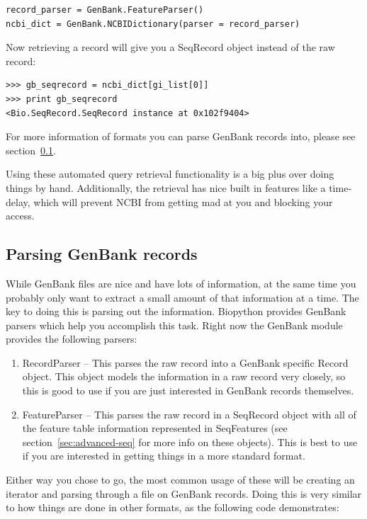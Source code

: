 \documentclass{report}
\begin{document}
\begin{verbatim}
record_parser = GenBank.FeatureParser()
ncbi_dict = GenBank.NCBIDictionary(parser = record_parser)
\end{verbatim}

Now retrieving a record will give you a SeqRecord object instead of the raw record:

\begin{verbatim}
>>> gb_seqrecord = ncbi_dict[gi_list[0]]
>>> print gb_seqrecord
<Bio.SeqRecord.SeqRecord instance at 0x102f9404>
\end{verbatim}

For more information of formats you can parse GenBank records into, please see section~\ref{sec:gb-parsing}.


Using these automated query retrieval functionality is a big plus over doing things by hand. Additionally, the retrieval has nice built in features like a time-delay, which will prevent NCBI from getting mad at you and blocking your access.

\subsection{Parsing GenBank records}
\label{sec:gb-parsing}

While GenBank files are nice and have lots of information, at the same time you probably only want to extract a small amount of that information at a time. The key to doing this is parsing out the information. Biopython provides GenBank parsers which help you accomplish this task. Right now the GenBank module provides the following parsers:

\begin{enumerate}
  \item RecordParser -- This parses the raw record into a GenBank specific Record object. This object models the information in a raw record very closely, so this is good to use if you are just interested in GenBank records themselves.

  \item FeatureParser -- This parses the raw record in a SeqRecord object with all of the feature table information represented in SeqFeatures (see section~\ref{sec:advanced-seq} for more info on these objects). This is best to use if you are interested in getting things in a more standard format.
\end{enumerate}

Either way you chose to go, the most common usage of these will be creating an iterator and parsing through a file on GenBank records. Doing this is very similar to how things are done in other formats, as the following code demonstrates:
\end{document}

